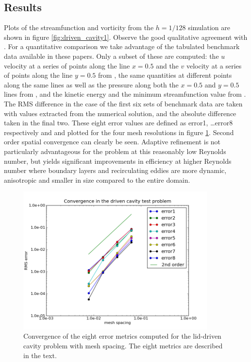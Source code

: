 \subsection{Results}
Plots of the streamfunction and vorticity from the $h=1/128$ simulation are shown in figure \ref{fig:driven_cavity1}.
Observe the good qualitative agreement with \citep{botella1998,erturk2005,bruneau2006}. 
For a quantitative comparison we take advantage of the tabulated benchmark data available in these papers.
Only a subset of these are computed: the $u$ velocity at a series of points along the line $x=0.5$ and the
$v$ velocity at a series of points along the line $y=0.5$ from \citep{erturk2005}, the same quantities at
different points along the same lines as well as the pressure along both the $x=0.5$ and $y=0.5$ lines from 
\citep{botella1998}, and the kinetic energy and the minimum streamfunction value from \citep{bruneau2006}.
The RMS difference in the case of the first six sets of benchmark data are taken with values extracted from 
the numerical solution, and the absolute difference taken in the final two. These eight error values are
defined as error1, \ldots error8 respectively and and plotted for the four mesh resolutions in figure 
\ref{fig:driven_cavity2}.
Second order spatial convergence can clearly be seen.
Adaptive refinement is not particularly advantageous for the problem at this reasonably low Reynolds number, but
yields significant improvements in efficiency at higher Reynolds number where boundary layers and
recirculating eddies are more dynamic, anisotropic and smaller in size compared to the entire domain.

\begin{figure}
\centering
\includegraphics[width=10cm,clip]{examples_images/driven_cavity/driven_cavity_error_plot.png}
\caption{Convergence of the eight error metrics computed for the lid-driven cavity problem with mesh spacing. The eight
metrics are described in the text.}
\label{fig:driven_cavity2}
\end{figure}

